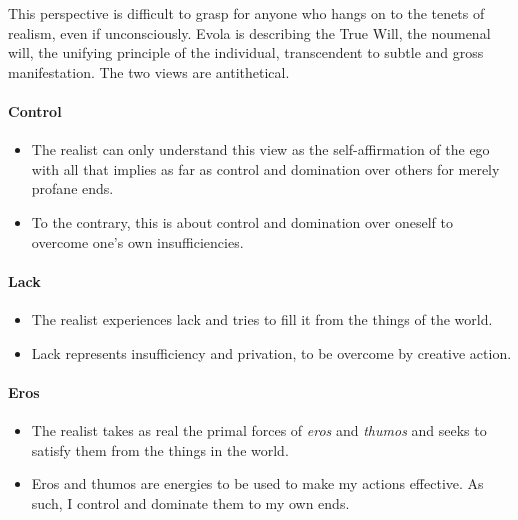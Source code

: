 This perspective is difficult to grasp for anyone who hangs on to the tenets of realism, even if unconsciously. Evola is describing the True Will, the noumenal will, the unifying principle of the individual, transcendent to subtle and gross manifestation. The two views are antithetical.

\paragraph{Control}


\begin{itemize}


\item The realist can only understand this view as the self-affirmation of the ego with all that implies as far as control and domination over others for merely profane ends.

\item To the contrary, this is about control and domination over oneself to overcome one's own insufficiencies.
\end{itemize}


\paragraph{Lack}


\begin{itemize}


\item The realist experiences lack and tries to fill it from the things of the world.

\item Lack represents insufficiency and privation, to be overcome by creative action.
\end{itemize}


\paragraph{Eros}


\begin{itemize}


\item The realist takes as real the primal forces of \emph{eros} and   \emph{thumos} and seeks to satisfy them from the things in the world.


\item Eros and thumos are energies to be used to make my actions effective. As such, I control and dominate them to my own ends.
\end{itemize}


